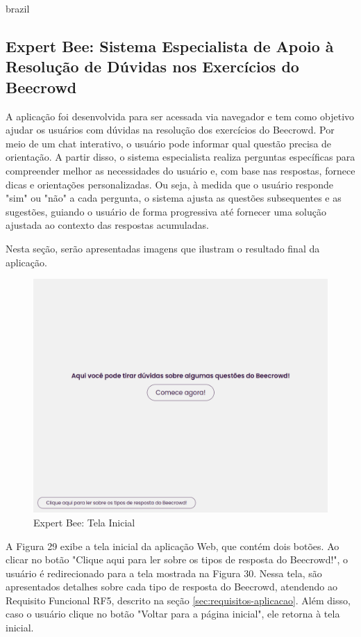 \begin{otherlanguage*}{brazil}
\subsection{Expert Bee: Sistema Especialista de Apoio à Resolução de Dúvidas nos Exercícios do Beecrowd}

A aplicação foi desenvolvida para ser acessada via navegador e tem como objetivo ajudar os usuários com dúvidas na resolução dos exercícios do Beecrowd. Por meio de um chat interativo, o usuário pode informar qual questão precisa de orientação. A partir disso, o sistema especialista realiza perguntas específicas para compreender melhor as necessidades do usuário e, com base nas respostas, fornece dicas e orientações personalizadas. Ou seja, à medida que o usuário responde "sim" ou "não" a cada pergunta, o sistema ajusta as questões subsequentes e as sugestões, guiando o usuário de forma progressiva até fornecer uma solução ajustada ao contexto das respostas acumuladas.

Nesta seção, serão apresentadas imagens que ilustram o resultado final da aplicação.

\begin{figure}[H]
    \centering
            \caption{Expert Bee: Tela Inicial}
            \label{fig:ModeloConceitual}
        \includegraphics[scale=0.41]{pictures/desenvolvimento/expert_bee_tela_inicial.png}
\end{figure}

A Figura 29 exibe a tela inicial da aplicação Web, que contém dois botões. Ao clicar no botão "Clique aqui para ler sobre os tipos de resposta do Beecrowd!", o usuário é redirecionado para a tela mostrada na Figura 30. Nessa tela, são apresentados detalhes sobre cada tipo de resposta do Beecrowd, atendendo ao Requisito Funcional RF5, descrito na seção \ref{sec:requisitos-aplicacao}. Além disso, caso o usuário clique no botão "Voltar para a página inicial", ele retorna à tela inicial.


\end{otherlanguage*}

